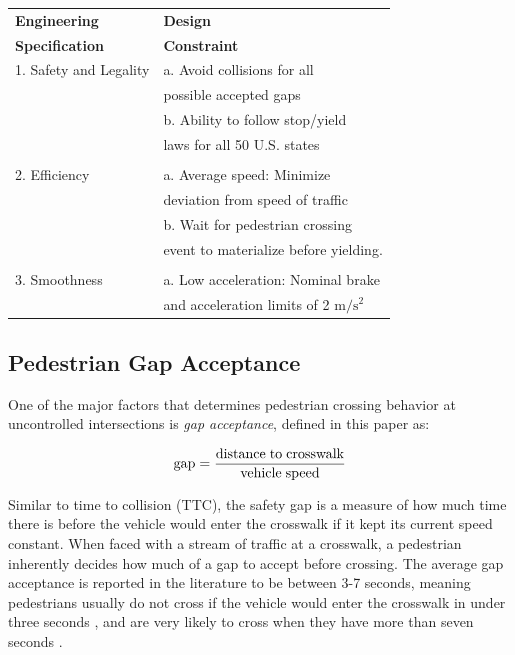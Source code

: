 \documentclass[letterpaper, 10 pt, conference]{ieeeconf}  %
\begin{document}
\begin{center}
\begin{tabular}{ l| l }
\label{tb:specs}
 \textbf{Engineering} & \textbf{Design} \\
 \textbf{Specification\cite{Thornton2018}} & \textbf{Constraint}\\\hline 
 1. Safety and Legality & a. Avoid collisions for all\\
                     & possible accepted gaps                        \\
                     &b. Ability to follow stop/yield    \\
                     &laws for all 50 U.S. states\\
                     
&\\
 2. Efficiency & a. Average speed: Minimize  \\ 
               & deviation from speed of traffic \\    
               & b. Wait for pedestrian crossing \\
               & event to materialize before yielding. \\ 

               & \\
 3. Smoothness & a. Low acceleration: Nominal brake \\ 
 			   & and acceleration limits of 2 $\mathrm{m/s^2}$ \\


\end{tabular}
\end{center}

\subsection{Pedestrian Gap Acceptance}

One of the major factors that determines pedestrian crossing behavior at uncontrolled intersections is \textit{gap acceptance}, defined in this paper as:

\begin{equation}
\mathrm{gap} = \frac{\mathrm{distance\hspace{1mm}to\hspace{1mm}crosswalk}}{\mathrm{vehicle\hspace{1mm}speed}}
\end{equation} 

Similar to time to collision (TTC), the safety gap is a measure of how much time there is before the vehicle would enter the crosswalk if it kept its current speed constant. When faced with a stream of traffic at a crosswalk, a pedestrian inherently decides how much of a gap to accept before crossing. The average gap acceptance is reported in the literature to be between 3-7 seconds, meaning pedestrians usually do not cross if the vehicle would enter the crosswalk in under three seconds \cite{DiPietroCharlesMandKing1970}, and are very likely to cross when they have more than seven seconds \cite{Schmidt2009}. 
\end{document}
